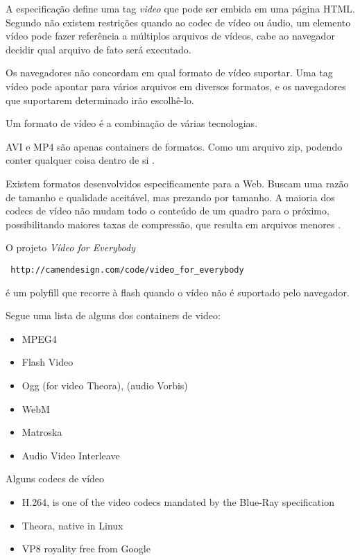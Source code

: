 A especificação define uma tag \textit{video} que pode ser embida em uma página HTML. Segundo \cite{diveIntohtml} não existem restrições quando ao codec de vídeo ou áudio, um elemento vídeo pode fazer referência a múltiplos arquivos de vídeos, cabe ao navegador decidir qual arquivo de fato será executado.

Os navegadores não concordam em qual formato de vídeo suportar.
Uma tag vídeo pode apontar para vários arquivos em diversos formatos, e os navegadores que suportarem determinado irão escolhê-lo.

Um formato de vídeo é a combinação de várias tecnologias.

AVI e MP4 são apenas containers de formatos. Como um arquivo zip, podendo conter qualquer coisa dentro de si \autocite{diveIntohtml}.

Existem formatos desenvolvidos especificamente para a Web. Buscam uma razão de tamanho e qualidade aceitável, mas prezando por tamanho. A maioria dos codecs de vídeo não mudam todo o conteúdo de um quadro para o próximo, possibilitando maiores taxas de compressão, que resulta em arquivos menores \autocite{diveIntohtml}.

O projeto \textit{Vídeo for Everybody} \begin{verbatim} http://camendesign.com/code/video_for_everybody \end{verbatim} é um polyfill que recorre à flash quando o vídeo não é suportado pelo navegador.


Segue uma lista de alguns dos containers de video:
\begin{itemize}
    \item{MPEG4}
    \item{Flash Video}
    \item{Ogg} (for video Theora), (audio Vorbis)
    \item{WebM}
    \item{Matroska}
    \item{Audio Video Interleave}
\end{itemize}

Alguns codecs de vídeo
\begin{itemize}
    \item{H.264, is one of the video codecs mandated by the Blue-Ray specification}
    \item{Theora, native in Linux}
    \item{VP8 royality free from Google}
\end{itemize}

